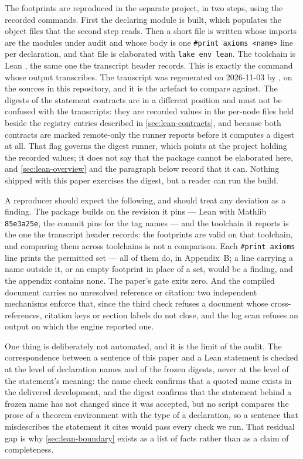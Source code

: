The footprints are reproduced in the separate project, in two steps, using the
recorded commands. First the declaring module is built, which populates the
object files that the second step reads. Then a short file is written whose
imports are the modules under audit and whose body is one
\texttt{\#print axioms <name>} line per declaration, and that file is elaborated
with \texttt{lake env lean}. The toolchain is Lean \LeanToolchain{}, the same one
the transcript header records. This is exactly the command whose output
 transcribes. The transcript was regenerated on
2026-11-03 by , on the sources in this repository,
and it is the artefact to compare against.  The digests of the statement contracts are in a different position and must not
be confused with the transcripts: they are recorded values in the per-node files
held beside the registry entries described in \cref{sec:lean-contracts}, and
because both contracts are marked remote-only the runner reports 
before it computes a digest at all.  That flag governs the digest runner, which
points at the project holding the recorded values; it does not say that the
package cannot be elaborated here, and \cref{sec:lean-overview} and the paragraph
below record that it can.  Nothing shipped with this paper exercises the digest,
but a reader can run the build.

A reproducer should expect the following, and should treat any deviation as a
finding. The package builds on the revision it pins --- Lean \LeanToolchain{}
with Mathlib \texttt{85e3a25e}, the commit  pins for the
tag  names --- and the toolchain it reports is the one
the transcript header records: the footprints are valid on that toolchain, and
comparing them across toolchains is not a comparison. Each
\texttt{\#print axioms} line prints the permitted set --- all
\NumChainTheorems{} of them do, in Appendix~B; a line carrying a name outside it,
or an empty footprint in place of a set, would be a finding, and the appendix
contains none. The paper's gate exits zero. And the compiled document carries no
unresolved reference or citation: two independent mechanisms enforce that, since
the third check refuses a document whose cross-references, citation keys or
section labels do not close, and the log scan refuses an output on which the
engine reported one.

One thing is deliberately not automated, and it is the limit of the audit. The
correspondence between a sentence of this paper and a Lean statement is checked
at the level of declaration names and of the frozen digests, never at the level
of the statement's meaning: the name check confirms that a quoted name exists in
the delivered development, and the digest confirms that the statement behind a
frozen name has not changed since it was accepted, but no script compares the
prose of a theorem environment with the type of a declaration, so a sentence
that misdescribes the statement it cites would pass every check we run. That
residual gap is why \cref{sec:lean-boundary} exists as a list of facts rather
than as a claim of completeness.

